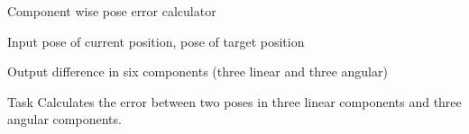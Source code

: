 \begin{frame}{Component wise pose error calculator}
	\begin{alertblock}{Input}
	pose of current position, pose of target position
    \end{alertblock}
    
    \begin{alertblock}{Output}
	difference in six components (three linear and three angular)
    \end{alertblock}
    
    \begin{alertblock}{Task}
    Calculates the error between two poses in three linear components and three angular components.
    \end{alertblock}
\end{frame}

